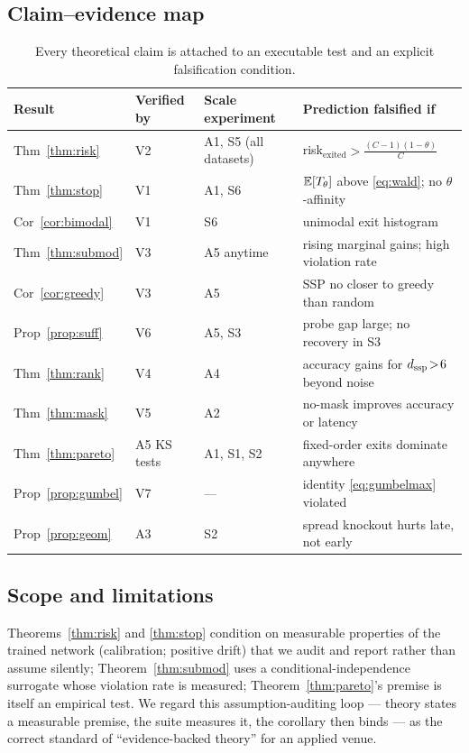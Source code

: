 \subsection{Claim--evidence map}
\begin{table}[h]
\centering\small
\begin{tabular}{@{}llll@{}}
\toprule
Result & Verified by & Scale experiment & Prediction falsified if \\
\midrule
Thm~\ref{thm:risk} & V2 & A1, S5 (all datasets) & risk$_{\mathrm{exited}} > \frac{(C-1)(1-\theta)}{C}$ \\
Thm~\ref{thm:stop} & V1 & A1, S6 & $\mathbb{E}[T_\theta]$ above \eqref{eq:wald}; no $\theta$-affinity \\
Cor~\ref{cor:bimodal} & V1 & S6 & unimodal exit histogram \\
Thm~\ref{thm:submod} & V3 & A5 anytime & rising marginal gains; high violation rate \\
Cor~\ref{cor:greedy} & V3 & A5 & SSP no closer to greedy than random \\
Prop~\ref{prop:suff} & V6 & A5, S3 & probe gap large; no recovery in S3 \\
Thm~\ref{thm:rank} & V4 & A4 & accuracy gains for $d_{\mathrm{ssp}}\!>\!6$ beyond noise \\
Thm~\ref{thm:mask} & V5 & A2 & no-mask improves accuracy or latency \\
Thm~\ref{thm:pareto} & A5 KS tests & A1, S1, S2 & fixed-order exits dominate anywhere \\
Prop~\ref{prop:gumbel} & V7 & --- & identity \eqref{eq:gumbelmax} violated \\
Prop~\ref{prop:geom} & A3 & S2 & spread knockout hurts late, not early \\
\bottomrule
\end{tabular}
\caption{Every theoretical claim is attached to an executable test and an
explicit falsification condition.}
\end{table}

\subsection{Scope and limitations}
Theorems~\ref{thm:risk} and \ref{thm:stop} condition on measurable
properties of the trained network (calibration; positive drift) that we
audit and report rather than assume silently; Theorem~\ref{thm:submod}
uses a conditional-independence surrogate whose violation rate is measured;
Theorem~\ref{thm:pareto}'s premise is itself an empirical test. We regard
this assumption-auditing loop --- theory states a measurable premise, the
suite measures it, the corollary then binds --- as the correct standard of
``evidence-backed theory'' for an applied venue.


